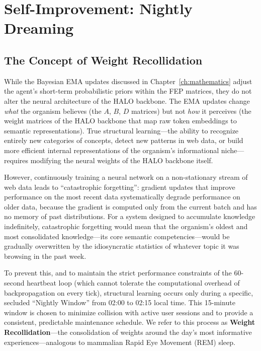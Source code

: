 \chapter{Self-Improvement: Nightly Dreaming}

\section{The Concept of Weight Recollidation}

While the Bayesian EMA updates discussed in Chapter~\ref{ch:mathematics} adjust the agent's short-term probabilistic priors within the FEP matrices, they do not alter the neural architecture of the HALO backbone. The EMA updates change \textit{what} the organism believes (the $A$, $B$, $D$ matrices) but not \textit{how} it perceives (the weight matrices of the HALO backbone that map raw token embeddings to semantic representations). True structural learning---the ability to recognize entirely new categories of concepts, detect new patterns in web data, or build more efficient internal representations of the organism's informational niche---requires modifying the neural weights of the HALO backbone itself.

However, continuously training a neural network on a non-stationary stream of web data leads to ``catastrophic forgetting'': gradient updates that improve performance on the most recent data systematically degrade performance on older data, because the gradient is computed only from the current batch and has no memory of past distributions. For a system designed to accumulate knowledge indefinitely, catastrophic forgetting would mean that the organism's oldest and most consolidated knowledge---its core semantic competencies---would be gradually overwritten by the idiosyncratic statistics of whatever topic it was browsing in the past week.

To prevent this, and to maintain the strict performance constraints of the 60-second heartbeat loop (which cannot tolerate the computational overhead of backpropagation on every tick), structural learning occurs only during a specific, secluded ``Nightly Window'' from 02:00 to 02:15 local time. This 15-minute window is chosen to minimize collision with active user sessions and to provide a consistent, predictable maintenance schedule. We refer to this process as \textbf{Weight Recollidation}---the consolidation of weights around the day's most informative experiences---analogous to mammalian Rapid Eye Movement (REM) sleep.

